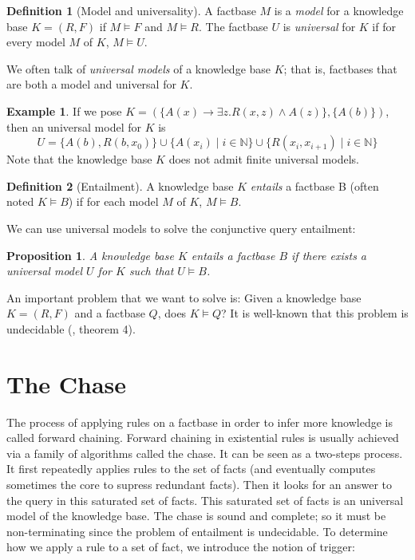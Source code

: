 \documentclass{article}
\newtheorem{proposition}{Proposition}[section]
\theoremstyle{definition}
\newtheorem{definition}{Definition}[section]
\newtheorem{example}{Example}[section]
\theoremstyle{remark}
\def \N {\mathbb N}
\begin{document}
\begin{definition}[Model and universality]
A factbase $M$ is a \emph{model} for a knowledge base $K = (R,F)$ if $M \vDash F$ and $M \vDash R$. The factbase $U$ is \emph{universal} for $K$ if for every model $M$ of $K$, $M \vDash U$.
\end{definition}

We often talk of \emph{universal models} of a knowledge base $K$; that is, factbases that are both a model and universal for $K$. 

\begin{example}
	If we pose $K = (\{A(x) \rightarrow \exists z.R(x,z) \wedge A(z)\},\{A(b)\})$, then an universal model for $K$ is $$U = \{A(b),R(b,x_0)\}\cup \{A(x_i)\mid i \in \N\}\cup \{R(x_i,x_{i+1}) \mid i \in \N\}$$ Note that the knowledge base $K$ does not admit finite universal models.
\end{example}

\begin{definition}[Entailment]
A knowledge base $K$ \emph{entails} a factbase B (often noted $K \vDash B$) if for each model $M$ of $K$, $M \vDash B$.
\end{definition}

We can use universal models to solve the conjunctive query entailment:

\begin{proposition}
A knowledge base $K$ entails a factbase $B$ if there exists a universal model $U$ for $K$ such that $U \vDash B$.
\end{proposition}

An important problem that we want to solve is: Given a knowledge base $K=(R,F)$ and a factbase $Q$,  does $K \vDash Q$? It  is  well-known  that  this  problem  is  undecidable (\cite{NP2}, theorem 4). 



\section{The Chase}

The process of applying rules on a factbase in order to infer more knowledge is called forward chaining.   Forward  chaining  in  existential  rules  is  usually achieved  via  a  family  of  algorithms  called the  chase. It can be seen as a two-steps process. It first repeatedly applies rules to the set of facts (and eventually computes sometimes the core to supress redundant facts). Then it looks for an answer to the query in this saturated set of facts. This saturated set of facts is an universal model of the knowledge base. The chase is sound and complete; so it must be non-terminating since the problem of entailment is undecidable. To determine how we apply a rule to a set of fact, we introduce the notion of trigger:
\end{document}
